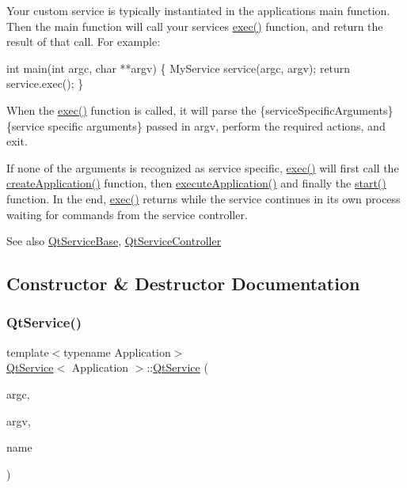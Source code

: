 Your custom service is typically instantiated in the application\textquotesingle{}s main function. Then the main function will call your service\textquotesingle{}s \hyperlink{class_qt_service_base_afae2e589de71c1ae3ae8db3dc9ab9c64}{exec()} function, and return the result of that call. For example\+:


\begin{DoxyCode}
\textcolor{keywordtype}{int} main(\textcolor{keywordtype}{int} argc, \textcolor{keywordtype}{char} **argv)
\{
    MyService service(argc, argv);
    \textcolor{keywordflow}{return} service.exec();
\}
\end{DoxyCode}


When the \hyperlink{class_qt_service_base_afae2e589de71c1ae3ae8db3dc9ab9c64}{exec()} function is called, it will parse the  \{service\+Specific\+Arguments\} \{service specific arguments\} passed in {\ttfamily argv}, perform the required actions, and exit.

If none of the arguments is recognized as service specific, \hyperlink{class_qt_service_base_afae2e589de71c1ae3ae8db3dc9ab9c64}{exec()} will first call the \hyperlink{class_qt_service_a50aa2079345abfd0b1284be47e245b0b}{create\+Application()} function, then \hyperlink{class_qt_service_a84f5f60304117e1f11cc0ed16dc0b72e}{execute\+Application()} and finally the \hyperlink{class_qt_service_base_adbc0cd621b41bd3a6a1f62fda432e9e4}{start()} function. In the end, \hyperlink{class_qt_service_base_afae2e589de71c1ae3ae8db3dc9ab9c64}{exec()} returns while the service continues in its own process waiting for commands from the service controller.

\begin{DoxySeeAlso}{See also}
\hyperlink{class_qt_service_base}{Qt\+Service\+Base}, \hyperlink{class_qt_service_controller}{Qt\+Service\+Controller} 
\end{DoxySeeAlso}


\subsection{Constructor \& Destructor Documentation}
\mbox{\label{class_qt_service_aca39304919f89cbb95fca64f44a761ae}} 
\subsubsection{\texorpdfstring{Qt\+Service()}{QtService()}}
{\footnotesize\ttfamily template$<$typename Application$>$ \\
\hyperlink{class_qt_service}{Qt\+Service}$<$ Application $>$\+::\hyperlink{class_qt_service}{Qt\+Service} (\begin{DoxyParamCaption}\item[{int}]{argc,  }\item[{char $\ast$$\ast$}]{argv,  }\item[{const Q\+String \&}]{name }\end{DoxyParamCaption})\hspace{0.3cm}{\ttfamily [inline]}}

